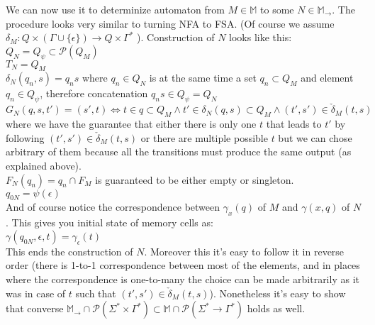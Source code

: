 \documentclass[12pt]{article}
\begin{document}
\begin{enumerate}
 We can now use it to determinize automaton from $M\in\mathbb{M}$ to some $N\in\mathbb{M}_\rightarrow$. The procedure looks very similar to turning NFA to FSA. (Of course we assume $\delta_M : Q \times (\Gamma \cup \{\epsilon \}) \rightarrow Q \times \Gamma^*$ ).
Construction of $N$ looks like this:\\
$Q_N = Q_\psi \subset \mathcal{P}(Q_M) $ \\
$T_N = Q_M $ \\
$\delta_N(q_n,s) = q_n s $ where $q_n\in Q_N$ is at the same time a set $q_n \subset Q_M$ and element $q_n \in Q_\psi $, therefore concatenation $q_ns \in Q_\psi = Q_N$\\
$G_N(q,s,t') = (s',t) \iff t \in q \subset  Q_M \wedge t' \in \delta_N(q,s) \subset  Q_M \wedge (t',s') \in \check{\delta}_M(t,s) $ where we have the guarantee that either there is only one $t$ that leads  to $t'$ by following $(t',s') \in \check{\delta}_M(t,s)$ or there are multiple possible $t$ but we can chose arbitrary of them because all the transitions must produce the same output (as explained above).\\
$F_N(q_n) = q_n \cap F_M$ is guaranteed to be either empty or singleton. \\
$q_{0N} = \psi(\epsilon)$ \\
And of course notice the correspondence between $\gamma_x(q)$ of $M$ and $\gamma(x,q)$ of $N$. This gives you initial state of memory cells as: \\
$\gamma(q_{0N},\epsilon,t) = \gamma_\epsilon(t)$ \\

This ends the construction of $N$. Moreover this it's easy to follow it in reverse order (there is 1-to-1 correspondence between most of the elements, and in places where the correspondence is one-to-many the choice can be made arbitrarily as it was in case of $t$ such that $(t',s') \in \check{\delta}_M(t,s)$). Nonetheless it's easy to show that converse $\mathbb{M}_\rightarrow \cap \mathcal{P}(\Sigma^* \times \Gamma^*) \subset   \mathbb{M} \cap \mathcal{P}(\Sigma^* \rightarrow \Gamma^*) $ holds as well.



\end{enumerate}
\end{document}

